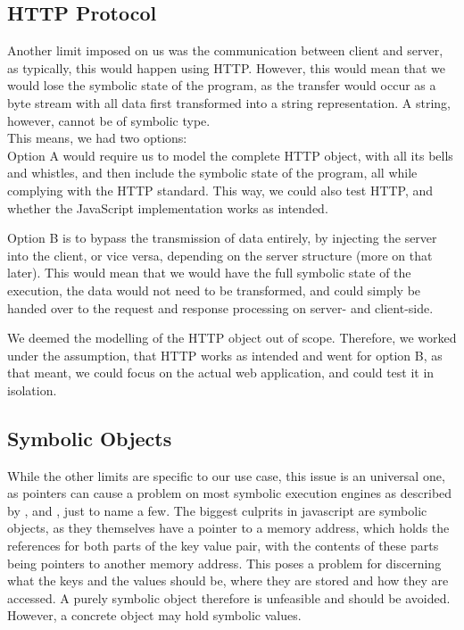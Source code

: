 \subsection{HTTP Protocol}
\label{sec:httpprot}
Another limit imposed on us was the communication between client and server, as typically, this would happen using HTTP. However, this would mean that we would lose the symbolic state of the program, as the transfer would occur as a byte stream with all data first transformed into a string representation. 
A string, however, cannot be of symbolic type. \\
This means, we had two options:\\
Option A would require us to model the complete HTTP object, with all its bells and whistles, and then include the symbolic state of the program, all while complying with the HTTP standard. This way, we could also test HTTP, and whether the JavaScript implementation works as intended.

Option B is to bypass the transmission of data entirely, by injecting the server into the client, or vice versa, depending on the server structure (more on that later). This would mean that we would have the full symbolic state of the execution, the data would not need to be transformed, and could simply be handed over to the request and response processing on server- and client-side.


We deemed the modelling of the HTTP object out of scope. Therefore, we worked under the assumption, that HTTP works as intended and went for option B, as that meant, we could focus on the actual web application, and could test it in isolation.


\subsection{Symbolic Objects}
\label{sec:sym-obj}
While the other limits are specific to our use case, this issue is an universal one, as pointers can cause a problem on most symbolic execution engines as described by \citet{cha_unleashing_2012}, \citet{coppa_rethinking_2017} and \citet{elkarablieh_precise_2009}, just to name a few. The biggest culprits in javascript are symbolic objects, as they themselves have a pointer to a memory address, which holds the references for both parts of the key value pair, with the contents of these parts being pointers to another memory address. This poses a problem for discerning what the keys and the values should be, where they are stored and how they are accessed. A purely symbolic object therefore is unfeasible and should be avoided. However, a concrete object may hold symbolic values.

